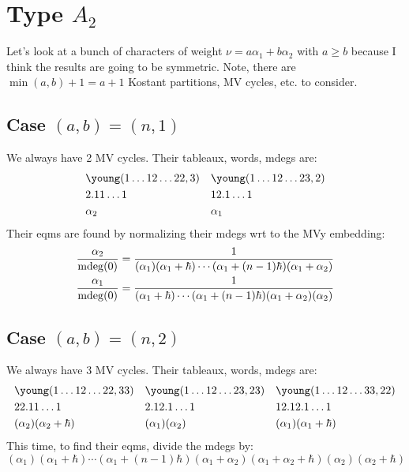 
\section{Type $A_2$}
% 
Let's look at a bunch of characters of weight $\nu = a\alpha_1 + b\alpha_2$ with $a \ge b$ because I think the results are going to be symmetric. Note, there are $\min(a,b)+1 = a+1$ Kostant partitions, MV cycles, etc. to consider.


\subsection{Case $(a,b) = (n,1)$} 
We always have 2 MV cycles. Their tableaux, words, mdegs are:
{\small
\[
\begin{aligned}
    &\young(1\dots12\dots22,3) & &\young(1\dots12\dots23,2) \\
    &2.11\dots1 & & 12.1\dots1 \\
    &\alpha_2 & & \alpha_1 
\end{aligned}    
\]}
Their eqms are found by normalizing their mdegs wrt to the MVy embedding:
$$\begin{aligned}
    \frac{\alpha_2}{\operatorname{mdeg}(0)} &= \frac 1 {(\alpha_1) (\alpha_1 + \hbar)\cdots (\alpha_1 + (n-1)\hbar) (\alpha_1 + \alpha_2)} \\
    \frac{\alpha_1}{\operatorname{mdeg}(0)} &= \frac 1 {(\alpha_1 + \hbar)\cdots(\alpha_1 + (n-1)\hbar)(\alpha_1 + \alpha_2)(\alpha_2)}
\end{aligned}$$
% 

\subsection{Case $(a,b) = (n,2)$} 
We always have 3 MV cycles. Their tableaux, words, mdegs are:
{\scriptsize
\[
\begin{aligned}
    &\young(1\dots12\dots22,33) & &\young(1\dots12\dots23,23) & & \young(1\dots12\dots33,22) \\
    &22.11\dots1 & & 2.12.1\dots1 & & 12.12.1\dots1\\
    &(\alpha_2)(\alpha_2 + \hbar) & & (\alpha_1)(\alpha_2) & & (\alpha_1)(\alpha_1 + \hbar) 
\end{aligned}    
\]}
This time, to find their eqms, divide the mdegs by:
\[
(\alpha_1)(\alpha_1 + \hbar)\cdots(\alpha_1 + (n-1)\hbar) (\alpha_1 + \alpha_2)(\alpha_1 + \alpha_2 + \hbar) (\alpha_2) (\alpha_2 + \hbar)    
\]

